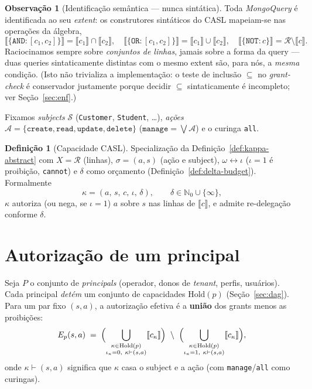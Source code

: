 \documentclass[11pt]{article}
\theoremstyle{definition}
\newtheorem{definition}[theorem]{Definição}
\newtheorem{remark}[theorem]{Observação}
\newcommand{\R}{\mathcal{R}}
\newcommand{\ext}[1]{\llbracket #1 \rrbracket}
\newcommand{\Subj}{\mathcal{S}}
\newcommand{\Act}{\mathcal{A}}
\newcommand{\dep}{\delta}
\newcommand{\NN}{\mathbb{N}_0}
\begin{document}
\begin{remark}[Identificação semântica --- nunca sintática]\label{rem:extent}
Toda \emph{MongoQuery} é identificada ao seu \emph{extent}: os construtores
sintáticos do CASL mapeiam-se nas operações da álgebra,
\[
  \ext{\{\texttt{AND}{:}[c_1,c_2]\}}=\ext{c_1}\cap\ext{c_2},\quad
  \ext{\{\texttt{OR}{:}[c_1,c_2]\}}=\ext{c_1}\cup\ext{c_2},\quad
  \ext{\{\texttt{NOT}{:}c\}}=\R\setminus\ext{c}.
\]
Raciocinamos sempre sobre \emph{conjuntos de linhas}, jamais sobre a forma
da query --- duas queries sintaticamente distintas com o mesmo extent são,
para nós, a \emph{mesma} condição. (Isto não trivializa a implementação: o
teste de inclusão $\subseteq$ no \emph{grant-check} é conservador justamente
porque decidir $\subseteq$ sintaticamente é incompleto; ver
Seção~\ref{sec:enf}.)
\end{remark}

Fixamos \emph{subjects} $\Subj$ (\texttt{Customer}, \texttt{Student}, \dots),
\emph{ações} $\Act=\{\texttt{create},\texttt{read},\texttt{update},
\texttt{delete}\}$ ($\texttt{manage}=\bigvee\Act$) e o curinga \texttt{all}.

\begin{definition}[Capacidade CASL]\label{def:cap}
Specialização da Definição~\ref{def:kappa-abstract} com $X=\R$ (linhas),
$\sigma=(a,s)$ (ação e subject), $\omega\leftrightarrow\iota$ ($\iota{=}1$ é
proibição, \texttt{cannot}) e $\dep$ como orçamento
(Definição~\ref{def:delta-budget}). Formalmente
\[
  \kappa=(a,\,s,\,c,\,\iota,\,\dep), \qquad
  \dep\in\NN\cup\{\infty\},
\]
$\kappa$ autoriza (ou nega, se $\iota{=}1$) $a$ sobre $s$ nas linhas de
$\ext{c}$, e admite re-delegação conforme $\dep$.
\end{definition}

\section{Autorização de um principal}

Seja $P$ o conjunto de \emph{principals} (operador, donos de \emph{tenant},
perfis, usuários). Cada principal \emph{detém} um conjunto de capacidades
$\mathrm{Hold}(p)$ (Seção~\ref{sec:dag}). Para um par fixo $(s,a)$, a
autorização efetiva é a \textbf{união} dos grants menos as proibições:
\[
  E_p(s,a)\;=\;
  \Bigl(\bigcup_{\substack{\kappa\in\mathrm{Hold}(p)\\ \iota_\kappa=0,\ \kappa\vdash(s,a)}}\ext{c_\kappa}\Bigr)
  \ \setminus\
  \Bigl(\bigcup_{\substack{\kappa\in\mathrm{Hold}(p)\\ \iota_\kappa=1,\ \kappa\vdash(s,a)}}\ext{c_\kappa}\Bigr),
\]
onde $\kappa\vdash(s,a)$ significa que $\kappa$ casa o subject e a ação
(com \texttt{manage}/\texttt{all} como curingas).
\end{document}
